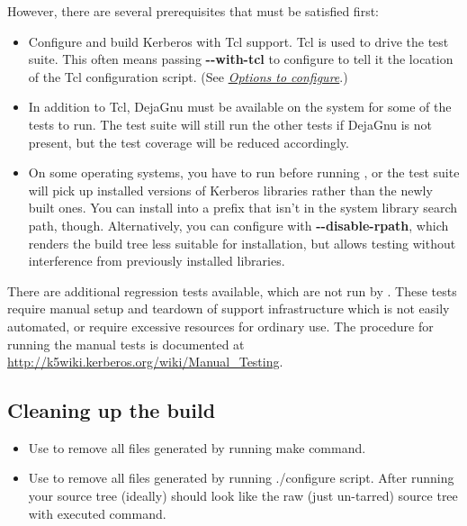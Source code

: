 \documentclass[letterpaper,10pt,english]{sphinxmanual}
\begin{document}
However, there are several prerequisites that must be satisfied first:
\begin{itemize}
\item {} 
Configure and build Kerberos with Tcl support. Tcl is used to drive
the test suite.  This often means passing \textbf{-}\textbf{-with-tcl} to
configure to tell it the location of the Tcl configuration
script. (See {\hyperref[build/options2configure:options2configure]{\emph{Options to configure}}}.)

\item {} 
In addition to Tcl, DejaGnu must be available on the system for some
of the tests to run.  The test suite will still run the other tests
if DejaGnu is not present, but the test coverage will be reduced
accordingly.

\item {} 
On some operating systems, you have to run  before
running , or the test suite will pick up installed
versions of Kerberos libraries rather than the newly built ones.
You can install into a prefix that isn't in the system library
search path, though. Alternatively, you can configure with
\textbf{-}\textbf{-disable-rpath}, which renders the build tree less suitable for
installation, but allows testing without interference from
previously installed libraries.

\end{itemize}

There are additional regression tests available, which are not run
by .  These tests require manual setup and teardown of
support infrastructure which is not easily automated, or require
excessive resources for ordinary use.  The procedure for running
the manual tests is documented at
\href{http://k5wiki.kerberos.org/wiki/Manual\_Testing}{http://k5wiki.kerberos.org/wiki/Manual\_Testing}.


\subsection{Cleaning up the build}
\label{build/doing_build:cleaning-up-the-build}\begin{itemize}
\item {} 
Use  to remove all files generated by running make
command.

\item {} 
Use  to remove all files generated by running
./configure script.  After running  your source
tree (ideally) should look like the raw (just un-tarred) source tree
with executed  command.

\end{itemize}
\end{document}
